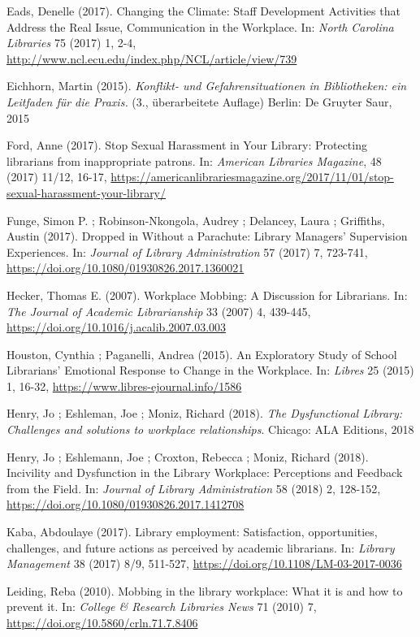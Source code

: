 \documentclass[a4paper,
fontsize=11pt,
oneside,
numbers=noperiodatend,
parskip=half-,
bibliography=totoc,
final
]{scrartcl}
\begin{document}
Eads, Denelle (2017). Changing the Climate: Staff Development Activities
that Address the Real Issue, Communication in the Workplace. In:
\emph{North Carolina Libraries} 75 (2017) 1, 2-4,
\url{http://www.ncl.ecu.edu/index.php/NCL/article/view/739}

Eichhorn, Martin (2015). \emph{Konflikt- und Gefahrensituationen in
Bibliotheken: ein Leitfaden für die Praxis.} (3., überarbeitete Auflage)
Berlin: De Gruyter Saur, 2015

Ford, Anne (2017). Stop Sexual Harassment in Your Library: Protecting
librarians from inappropriate patrons. In: \emph{American Libraries
Magazine}, 48 (2017) 11/12, 16-17,
\url{https://americanlibrariesmagazine.org/2017/11/01/stop-sexual-harassment-your-library/}

Funge, Simon P. ; Robinson-Nkongola, Audrey ; Delancey, Laura ;
Griffiths, Austin (2017). Dropped in Without a Parachute: Library
Managers' Supervision Experiences. In: \emph{Journal of Library
Administration} 57 (2017) 7, 723-741,
\url{https://doi.org/10.1080/01930826.2017.1360021}

Hecker, Thomas E. (2007). Workplace Mobbing: A Discussion for
Librarians. In: \emph{The Journal of Academic Librarianship} 33 (2007)
4, 439-445, \url{https://doi.org/10.1016/j.acalib.2007.03.003}

Houston, Cynthia ; Paganelli, Andrea (2015). An Exploratory Study of
School Librarians' Emotional Response to Change in the Workplace. In:
\emph{Libres} 25 (2015) 1, 16-32,
\url{https://www.libres-ejournal.info/1586}

Henry, Jo ; Eshleman, Joe ; Moniz, Richard (2018). \emph{The
Dysfunctional Library: Challenges and solutions to workplace
relationships}. Chicago: ALA Editions, 2018

Henry, Jo ; Eshlemann, Joe ; Croxton, Rebecca ; Moniz, Richard (2018).
Incivility and Dysfunction in the Library Workplace: Perceptions and
Feedback from the Field. In: \emph{Journal of Library Administration} 58
(2018) 2, 128-152, \url{https://doi.org/10.1080/01930826.2017.1412708}

Kaba, Abdoulaye (2017). Library employment: Satisfaction, opportunities,
challenges, and future actions as perceived by academic librarians. In:
\emph{Library Management} 38 (2017) 8/9, 511-527,
\url{https://doi.org/10.1108/LM-03-2017-0036}

Leiding, Reba (2010). Mobbing in the library workplace: What it is and
how to prevent it. In: \emph{College \& Research Libraries News} 71
(2010) 7, \url{https://doi.org/10.5860/crln.71.7.8406}
\end{document}
